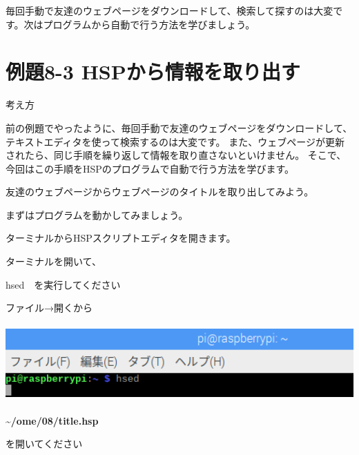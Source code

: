 \documentclass[a4paper,12pt,dvipdfmx]{jarticle}
\begin{document}
\bigskip

毎回手動で友達のウェブページをダウンロードして、検索して探すのは大変です。次はプログラムから自動で行う方法を学びましょう。

\clearpage\section{例題8-3 HSPから情報を取り出す}
考え方

前の例題でやったように、毎回手動で友達のウェブページをダウンロードして、テキストエディタを使って検索するのは大変です。
また、ウェブページが更新されたら、同じ手順を繰り返して情報を取り直さないといけません。
そこで、今回はこの手順をHSPのプログラムで自動で行う方法を学びます。

友達のウェブページからウェブページのタイトルを取り出してみよう。

まずはプログラムを動かしてみましょう。

ターミナルからHSPスクリプトエディタを開きます。

ターミナルを開いて、

hsed　を実行してください

ファイル→開くから

\begin{center}
\includegraphics[width=16.94cm,height=2.944cm]{textbook-img013.png}

\end{center}
\textbf{\~{}/ome/08/title.hsp}

を開いてください
\end{document}
